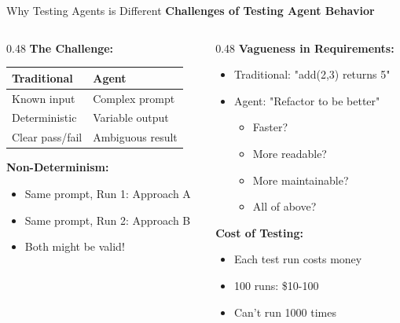 \documentclass[aspectratio=169,11pt]{beamer}
\begin{document}
\begin{frame}{Why Testing Agents is Different}
    \textbf{Challenges of Testing Agent Behavior}

    \begin{columns}[T]
        \begin{column}{0.48\textwidth}
            \textbf{The Challenge:}

            \begin{tabular}{ll}
                \toprule
                Traditional & Agent\\
                \midrule
                Known input & Complex prompt\\
                Deterministic & Variable output\\
                Clear pass/fail & Ambiguous result\\
                \bottomrule
            \end{tabular}

            \vspace{0.3cm}
            \textbf{Non-Determinism:}
            \begin{itemize}
                \item Same prompt, Run 1: Approach A
                \item Same prompt, Run 2: Approach B
                \item Both might be valid!
            \end{itemize}
        \end{column}
        \begin{column}{0.48\textwidth}
            \textbf{Vagueness in Requirements:}
            \begin{itemize}
                \item Traditional: "add(2,3) returns 5"
                \item Agent: "Refactor to be better"
                \begin{itemize}
                    \item Faster?
                    \item More readable?
                    \item More maintainable?
                    \item All of above?
                \end{itemize}
            \end{itemize}

            \vspace{0.3cm}
            \textbf{Cost of Testing:}
            \begin{itemize}
                \item Each test run costs money
                \item 100 runs: \$10-100
                \item Can't run 1000 times
            \end{itemize}


\end{column}
\end{columns}
\end{frame}
\end{document}
